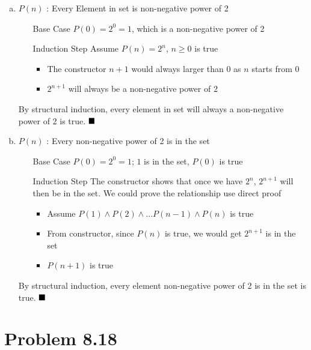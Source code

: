 \documentclass{article}
\def\math#1{$#1$}
\begin{document}
\begin{enumerate}[(a)]
    \item \math{P(n)} : Every Element in set is non-negative power of 2
        \begin{itemize}
            \item [Base Case] \math{P(0) = 2^0 = 1}, which is a non-negative power of 2
            \item [Induction Step] Assume \math{P(n) = 2^n}, \math{n \geq 0} is true
                \begin{itemize}
                    \item The constructor \math{n+1} would always larger than 0 as \math{n} starts from \math{0}
                    \item \math{2^{n+1}} will always be a non-negative power of 2
                \end{itemize}
        \end{itemize}
        By structural induction, every element in set will always a non-negative power of 2 is true. \math{\hfill{\blacksquare}}
    \item \math{P(n)} : Every non-negative power of 2 is in the set
        \begin{itemize}
            \item [Base Case] \math{P(0) = 2^0 = 1}; \math{1} is in the set, \math{P(0)} is true 
            \item [Induction Step] The constructor shows that once we have \math{2^n}, \math{2^{n+1}} will then be in the set. We could prove the relationship use direct proof
                \begin{itemize}
                    \item Assume \math{P(1) \land P(2) \land ... P(n-1) \land P(n)} is true
                    \item From constructor, since \math{P(n)} is true, we would get \math{2^{n+1}} is in the set
                    \item \math{P(n+1)} is true
                \end{itemize}
        \end{itemize}
     By structural induction, every element non-negative power of 2 is in the set is true. \math{\hfill{\blacksquare}}
\end{enumerate}

\section{Problem 8.18}
\end{document}
